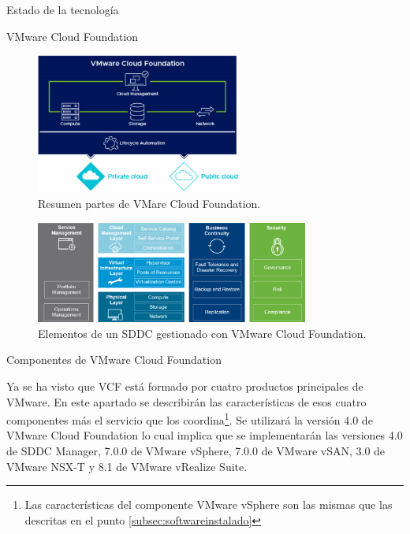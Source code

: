 \begin{section}{Estado de la tecnología}
\begin{subsection}{VMware Cloud Foundation}
\begin{itemize}
\end{itemize}
\begin{figure}[h!]
    \centering
    \includegraphics[width=0.6\textwidth]{imaxes/cap2recursos/overviewCF.png}
            \caption{Resumen partes de VMare Cloud Foundation.}
    \label{fig:Cloud-Foundation-Overview}
    \end{figure}
    \FloatBarrier
    \begin{figure}[h]
        \centering
        \includegraphics[width=0.8\textwidth]{imaxes/cap2recursos/SDDCoverview.png}
        \caption{Elementos de un SDDC gestionado con VMware Cloud Foundation.}
        \label{fig:layers-Sddc}
    \end{figure}
    \FloatBarrier
\end{subsection}

\begin{subsection}{Componentes de VMware Cloud Foundation \cite{componentesCloudFound}}
\label{subsubsect:cfcomponents}

Ya se ha visto que VCF está formado por cuatro productos principales de VMware. En este apartado se describirán las características de esos cuatro componentes más el servicio que los coordina\footnote{Las características del componente VMware vSphere son las mismas que las descritas en el punto \ref*{subsec:softwareinstalado}}. Se utilizará la versión 4.0 de VMware Cloud Foundation lo cual implica que se implementarán las versiones 4.0 de SDDC Manager, 7.0.0 de VMware vSphere, 7.0.0 de VMware vSAN, 3.0 de VMware NSX-T y 8.1 de VMware vRealize Suite.


\end{subsection}
\end{section}
